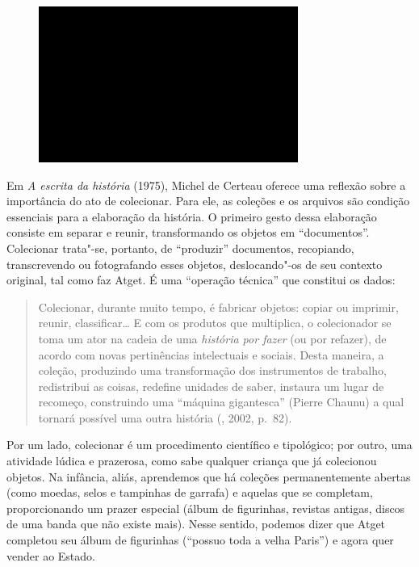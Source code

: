 \begin{figure}[!ht]

\centering
 \includegraphics[width=85mm]{./imgs/im1.jpg}
\caption{\tiny{}}

\end{figure}

Em \emph{A escrita da história} (1975), Michel de Certeau oferece uma
reflexão sobre a importância do ato de colecionar. Para ele, as coleções
e os arquivos são condição essenciais para a elaboração da história. O
primeiro gesto dessa elaboração consiste em separar e reunir,
transformando os objetos em ``documentos''. Colecionar trata"-se,
portanto, de ``produzir'' documentos, recopiando, transcrevendo ou
fotografando esses objetos, deslocando"-os de seu contexto original, tal
como faz Atget. É uma ``operação técnica'' que constitui os dados:

\begin{quote}
Colecionar, durante muito tempo, é fabricar objetos: copiar ou imprimir,
reunir, classificar\ldots{} E com os produtos que multiplica, o colecionador
se toma um ator na cadeia de uma \emph{história por fazer} (ou por
refazer), de acordo com novas pertinências intelectuais e sociais. Desta
maneira, a coleção, produzindo uma transformação dos instrumentos de
trabalho, redistribui as coisas, redefine unidades de saber, instaura um
lugar de recomeço, construindo uma ``máquina gigantesca'' (Pierre
Chaunu) a qual tornará possível uma outra história (, 2002,
p.~82).
\end{quote}

Por um lado, colecionar é um procedimento científico e tipológico; por
outro, uma atividade lúdica e prazerosa, como sabe qualquer criança que
já colecionou objetos. Na infância, aliás, aprendemos que há coleções
permanentemente abertas (como moedas, selos e tampinhas de garrafa) e
aquelas que se completam, proporcionando um prazer especial (álbum de
figurinhas, revistas antigas, discos de uma banda que não existe mais).
Nesse sentido, podemos dizer que Atget completou seu álbum de figurinhas
(``possuo toda a velha Paris'') e agora quer vender ao Estado.

